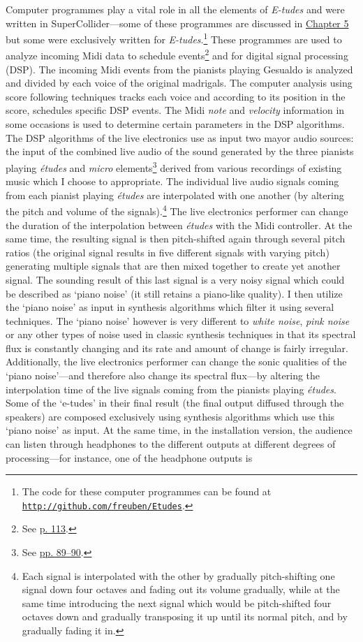 Computer programmes play a vital role in all the elements of \emph{E-tudes} and were written in SuperCollider---some of these programmes are discussed in \hyperlink{chapter5}{Chapter 5} but some were exclusively written for \emph{E-tudes}.\footnote{The code for these computer programmes can be found at \href{http://github.com/freuben/Etudes}{\texttt {http://github.com/freuben/Etudes}}.} These programmes are used to analyze incoming Midi data to schedule events\footnote{See \hyperlink{miditrig}{p. 113}.} and for digital signal processing (DSP). The incoming Midi events from the pianists playing Gesualdo is analyzed and divided by each voice of the original madrigals. The computer analysis using score following techniques tracks each voice and according to its position in the score, schedules specific DSP events. The Midi \emph{note} and \emph{velocity} information in some occasions is used to determine certain parameters in the DSP algorithms. The DSP algorithms of the live electronics use as input two mayor audio sources: the input of the combined live audio of the sound generated by the three pianists playing \emph{\'{e}tudes} and \emph{micro} elements\footnote{See \hyperlink{macroplunder}{pp. 89--90}.} derived from various recordings of existing music which I choose to appropriate. The individual live audio signals coming from each pianist playing \emph{\'{e}tudes} are interpolated with one another (by altering the pitch and volume of the signals).\footnote{Each signal is interpolated with the other by gradually pitch-shifting one signal down four octaves and fading out its volume gradually, while at the same time introducing the next signal which would be pitch-shifted four octaves down and gradually transposing it up until its normal pitch, and by gradually fading it in.} The live electronics performer can change the duration of the interpolation between \emph{\'{e}tudes} with the Midi controller. At the same time, the resulting signal is then pitch-shifted again through several pitch ratios (the original signal results in five different signals with varying pitch) generating multiple signals that are then mixed together to create yet another signal. The sounding result of this last signal is a very noisy signal which could be described as `piano noise' (it still retains a piano-like quality). I then utilize the `piano noise' as input in synthesis algorithms which filter it using several techniques. The `piano noise' however is very different to \emph{white noise}, \emph{pink noise} or any other types of noise used in classic synthesis techniques in that its spectral flux is constantly changing and its rate and amount of change is fairly irregular. Additionally, the live electronics performer can change the sonic qualities of the `piano noise'---and therefore also change its spectral flux---by altering the interpolation time of the live signals coming from the pianists playing \emph{\'{e}tudes}. Some of the `e-tudes' in their final result (the final output diffused through the speakers) are composed exclusively using synthesis algorithms which use this `piano noise' as input. At the same time, in the installation version, the audience can listen through headphones to the different outputs at different degrees of processing---for instance, one of the headphone outputs is 